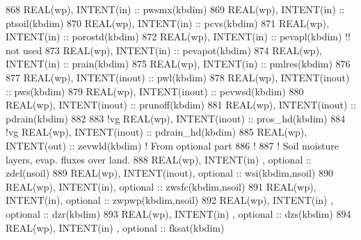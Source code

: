 \begin{DoxyCode}
868   \textcolor{keywordtype}{REAL(wp)}, \textcolor{keywordtype}{INTENT(in)}    :: pwsmx(kbdim)
869   \textcolor{keywordtype}{REAL(wp)}, \textcolor{keywordtype}{INTENT(in)}    :: ptsoil(kbdim)
870   \textcolor{keywordtype}{REAL(wp)}, \textcolor{keywordtype}{INTENT(in)}    :: pcvs(kbdim)
871   \textcolor{keywordtype}{REAL(wp)}, \textcolor{keywordtype}{INTENT(in)}    :: porostd(kbdim)
872   \textcolor{keywordtype}{REAL(wp)}, \textcolor{keywordtype}{INTENT(in)}    :: pevapl(kbdim)      \textcolor{comment}{!! not used}
873   \textcolor{keywordtype}{REAL(wp)}, \textcolor{keywordtype}{INTENT(in)}    :: pevapot(kbdim)
874   \textcolor{keywordtype}{REAL(wp)}, \textcolor{keywordtype}{INTENT(in)}    :: prain(kbdim)
875   \textcolor{keywordtype}{REAL(wp)}, \textcolor{keywordtype}{INTENT(in)}    :: pmlres(kbdim)
876 
877   \textcolor{keywordtype}{REAL(wp)}, \textcolor{keywordtype}{INTENT(inout)} :: pwl(kbdim)
878   \textcolor{keywordtype}{REAL(wp)}, \textcolor{keywordtype}{INTENT(inout)} :: pws(kbdim)
879   \textcolor{keywordtype}{REAL(wp)}, \textcolor{keywordtype}{INTENT(inout)} :: pevwsd(kbdim)
880   \textcolor{keywordtype}{REAL(wp)}, \textcolor{keywordtype}{INTENT(inout)} :: prunoff(kbdim)
881   \textcolor{keywordtype}{REAL(wp)}, \textcolor{keywordtype}{INTENT(inout)} :: pdrain(kbdim)
882 
883 \textcolor{comment}{!vg   REAL(wp), INTENT(inout) :: pros\_hd(kbdim)}
884 \textcolor{comment}{!vg   REAL(wp), INTENT(inout) :: pdrain\_hd(kbdim)}
885   \textcolor{keywordtype}{REAL(wp)}, \textcolor{keywordtype}{INTENT(out)}   :: zevwld(kbdim) \textcolor{comment}{! From optional part}
886 \textcolor{comment}{!}
887 \textcolor{comment}{! Soil moisture layers, evap. fluxes over land.}
888   \textcolor{keywordtype}{REAL(wp)}, \textcolor{keywordtype}{INTENT(in)}   , \textcolor{keywordtype}{optional} :: zdel(nsoil)
889   \textcolor{keywordtype}{REAL(wp)}, \textcolor{keywordtype}{INTENT(inout)}, \textcolor{keywordtype}{optional} :: wsi(kbdim,nsoil)
890   \textcolor{keywordtype}{REAL(wp)}, \textcolor{keywordtype}{INTENT(in)}, \textcolor{keywordtype}{optional} :: zwsfc(kbdim,nsoil)
891   \textcolor{keywordtype}{REAL(wp)}, \textcolor{keywordtype}{INTENT(in)}, \textcolor{keywordtype}{optional} :: zwpwp(kbdim,nsoil)
892   \textcolor{keywordtype}{REAL(wp)}, \textcolor{keywordtype}{INTENT(in)}   , \textcolor{keywordtype}{optional} :: dzr(kbdim)
893   \textcolor{keywordtype}{REAL(wp)}, \textcolor{keywordtype}{INTENT(in)}   , \textcolor{keywordtype}{optional} :: dzs(kbdim)
894   \textcolor{keywordtype}{REAL(wp)}, \textcolor{keywordtype}{INTENT(in)}   , \textcolor{keywordtype}{optional} :: fksat(kbdim)

\end{DoxyCode}
